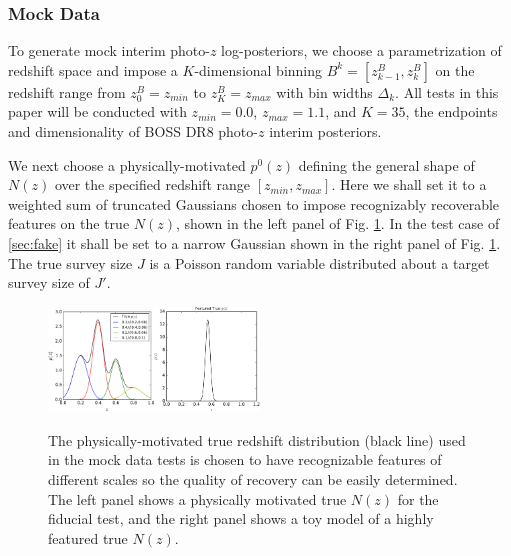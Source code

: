 \documentclass[preprint]{aastex}
\begin{document}
\subsubsection{Mock Data}
\label{sec:mock}

To generate mock interim photo-$z$ log-posteriors, we choose a parametrization 
of redshift space and impose a $K$-dimensional binning 
$B^{k}=[z^{B}_{k-1},z^{B}_{k}]$ on the redshift range from $z^{B}_{0}=z_{min}$ 
to $z^{B}_{K}=z_{max}$ with bin widths $\Delta_{k}$.  All tests in this paper 
will be conducted with $z_{min}=0.0$, $z_{max}=1.1$, and $K=35$, the endpoints 
and dimensionality of BOSS DR8 photo-$z$ interim posteriors.

We next choose a physically-motivated $p^{0}(z)$ defining the general shape of 
$N(z)$ over the specified redshift range $[z_{min},z_{max}]$.  Here we shall 
set it to a weighted sum of truncated Gaussians chosen to impose recognizably 
recoverable features on the true $N(z)$, shown in the left panel of Fig. 
\ref{fig:physpz}.  In the test case of \ref{sec:fake} it shall be set to a 
narrow Gaussian shown in the right panel of Fig. \ref{fig:physpz}.  The true 
survey size $J$ is a Poisson random variable distributed about a target survey 
size of $J'$.

\begin{figure}
\includegraphics[width=0.25\textwidth]{figs/null/physPz.pdf}\includegraphics[width=0.25\textwidth]{figs/delt/physPz.pdf}
\caption{The physically-motivated true redshift distribution (black line) used 
in the mock data tests is chosen to have recognizable features of different 
scales so the quality of recovery can be easily determined.  The left panel 
shows a physically motivated true $N(z)$ for the fiducial test, and the right 
panel shows a toy model of a highly featured true $N(z)$.}
\label{fig:physpz}
\end{figure}
\end{document}
